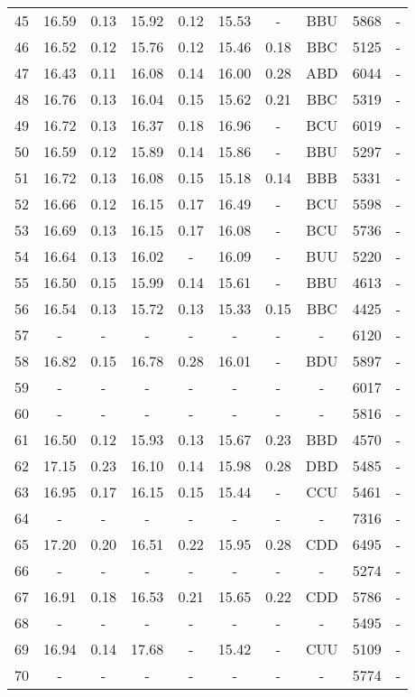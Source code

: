 \begin{longtable}{cccccccccc}
 45 & 16.59 & 0.13 & 15.92 & 0.12 & 15.53 & - & BBU & 5868 & -\\
 46 & 16.52 & 0.12 & 15.76 & 0.12 & 15.46 & 0.18 & BBC & 5125 & -\\
 47 & 16.43 & 0.11 & 16.08 & 0.14 & 16.00 & 0.28 & ABD & 6044 & -\\
 48 & 16.76 & 0.13 & 16.04 & 0.15 & 15.62 & 0.21 & BBC & 5319 & -\\
 49 & 16.72 & 0.13 & 16.37 & 0.18 & 16.96 & - & BCU & 6019 & -\\
 50 & 16.59 & 0.12 & 15.89 & 0.14 & 15.86 & - & BBU & 5297 & -\\
 51 & 16.72 & 0.13 & 16.08 & 0.15 & 15.18 & 0.14 & BBB & 5331 & -\\
 52 & 16.66 & 0.12 & 16.15 & 0.17 & 16.49 & - & BCU & 5598 & -\\
 53 & 16.69 & 0.13 & 16.15 & 0.17 & 16.08 & - & BCU & 5736 & -\\
 54 & 16.64 & 0.13 & 16.02 & - & 16.09 & - & BUU & 5220 & -\\
 55 & 16.50 & 0.15 & 15.99 & 0.14 & 15.61 & - & BBU & 4613 & -\\
 56 & 16.54 & 0.13 & 15.72 & 0.13 & 15.33 & 0.15 & BBC & 4425 & -\\
 57 & - & - & - & - & - & - & - & 6120 & -\\
 58 & 16.82 & 0.15 & 16.78 & 0.28 & 16.01 & - & BDU & 5897 & -\\
 59 & - & - & - & - & - & - & - & 6017 & -\\
 60 & - & - & - & - & - & - & - & 5816 & -\\
 61 & 16.50 & 0.12 & 15.93 & 0.13 & 15.67 & 0.23 & BBD & 4570 & -\\
 62 & 17.15 & 0.23 & 16.10 & 0.14 & 15.98 & 0.28 & DBD & 5485 & -\\
 63 & 16.95 & 0.17 & 16.15 & 0.15 & 15.44 & - & CCU & 5461 & -\\
 64 & - & - & - & - & - & - & - & 7316 & -\\
 65 & 17.20 & 0.20 & 16.51 & 0.22 & 15.95 & 0.28 & CDD & 6495 & -\\
 66 & - & - & - & - & - & - & - & 5274 & -\\
 67 & 16.91 & 0.18 & 16.53 & 0.21 & 15.65 & 0.22 & CDD & 5786 & -\\
 68 & - & - & - & - & - & - & - & 5495 & -\\
 69 & 16.94 & 0.14 & 17.68 & - & 15.42 & - & CUU & 5109 & -\\
 70 & - & - & - & - & - & - & - & 5774 & -\\

\end{longtable}
